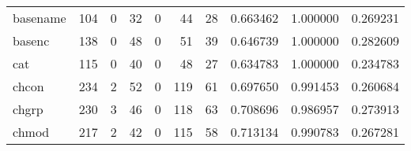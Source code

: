 \begin{tabular}{lrrrrrrrrr}
basename  &                                                104 &                                                  0 &                                                 32 &                                                  0 &                                                 44 &                                                 28 &                                           0.663462 &                               1.000000 &                             0.269231 \\
basenc    &                                                138 &                                                  0 &                                                 48 &                                                  0 &                                                 51 &                                                 39 &                                           0.646739 &                               1.000000 &                             0.282609 \\
cat       &                                                115 &                                                  0 &                                                 40 &                                                  0 &                                                 48 &                                                 27 &                                           0.634783 &                               1.000000 &                             0.234783 \\
chcon     &                                                234 &                                                  2 &                                                 52 &                                                  0 &                                                119 &                                                 61 &                                           0.697650 &                               0.991453 &                             0.260684 \\
chgrp     &                                                230 &                                                  3 &                                                 46 &                                                  0 &                                                118 &                                                 63 &                                           0.708696 &                               0.986957 &                             0.273913 \\
chmod     &                                                217 &                                                  2 &                                                 42 &                                                  0 &                                                115 &                                                 58 &                                           0.713134 &                               0.990783 &                             0.267281 \\

\end{tabular}
